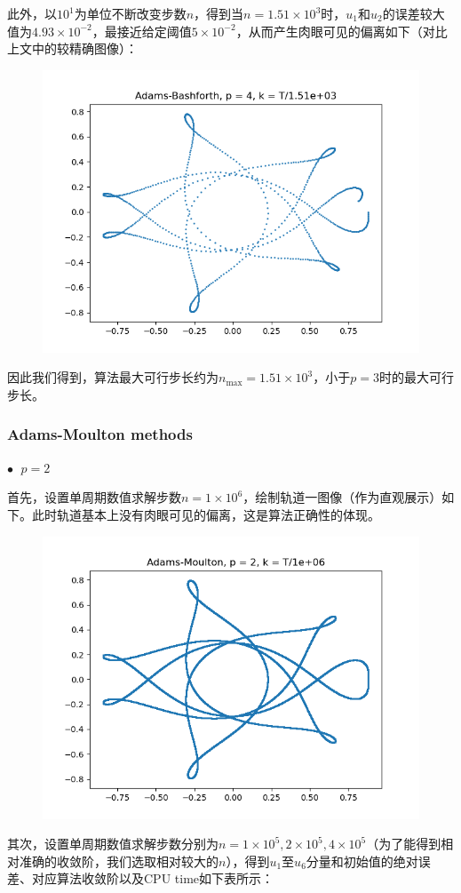 \documentclass{ctexart}
\begin{document}
\begin{sloppypar}
此外，以$10^1$为单位不断改变步数$n$，得到当$n = 1.51 \times 10^3$时，$u_1$和$u_2$的误差较大值为$4.93 \times 10^{-2}$，最接近给定阈值$5 \times 10^{-2}$，从而产生肉眼可见的偏离如下（对比上文中的较精确图像）：
\begin{figure}[H]
\centering
\includegraphics[scale = 0.45]{./report_src/Figure_47.png}
\end{figure}
因此我们得到，算法最大可行步长约为$n_{\max} = 1.51 \times 10^3$，小于$p=3$时的最大可行步长。

\subsubsection{Adams-Moulton methods}
$\bullet \;$ $p = 2$

首先，设置单周期数值求解步数$n = 1 \times 10^6$，绘制轨道一图像（作为直观展示）如下。此时轨道基本上没有肉眼可见的偏离，这是算法正确性的体现。
\begin{figure}[H]
\centering
\includegraphics[scale = 0.45]{./report_src/Figure_48.png}
\end{figure}
其次，设置单周期数值求解步数分别为$n = 1 \times 10^5,2 \times 10^5, 4 \times 10^5$（为了能得到相对准确的收敛阶，我们选取相对较大的$n$），得到$u_1$至$u_6$分量和初始值的绝对误差、对应算法收敛阶以及CPU time如下表所示：


\end{sloppypar}
\end{document}
